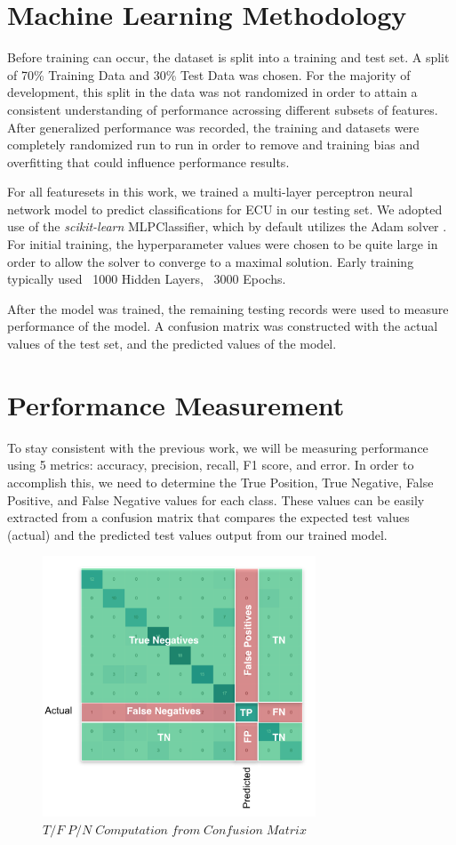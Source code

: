 \documentclass[conference]{IEEEtran}
\begin{document}
\section{Machine Learning Methodology}
Before training can occur, the dataset is split into a training and test set. A split of 70\% Training Data and 30\% Test Data was chosen. For the majority of development, this split in the data was not randomized in order to attain a consistent understanding of performance acrossing different subsets of features. After generalized performance was recorded, the training and datasets were completely randomized run to run in order to remove and training bias and overfitting that could influence performance results.

For all featuresets in this work, we trained a multi-layer perceptron neural network model to predict classifications for ECU in our testing set. We adopted use of the \textit{scikit-learn} MLPClassifier, which by default utilizes the Adam solver \cite{kingma2017adam}. For initial training, the hyperparameter values were chosen to be quite large in order to allow the solver to converge to a maximal solution. Early training typically used ~1000 Hidden Layers, ~3000 Epochs.

After the model was trained, the remaining testing records were used to measure performance of the model. A confusion matrix was constructed with the actual values of the test set, and the predicted values of the model.

\section{Performance Measurement}

To stay consistent with the previous work, we will be measuring performance using 5 metrics: accuracy, precision, recall, F1 score, and error. In order to accomplish this, we need to determine the True Position, True Negative, False Positive, and False Negative values for each class. These values can be easily extracted from a confusion matrix that compares the expected test values (actual) and the predicted test values output from our trained model.

\begin{figure}[htb]
\centering
\includegraphics[width=3.2in]{figures/60_cm_pm.png}
\caption{$T/F  \; P/N \; Computation  \; from \; Confusion \; Matrix$ \cite{bell2020}}
\label{fig:CMPerfMetric}
\end{figure}
\end{document}
